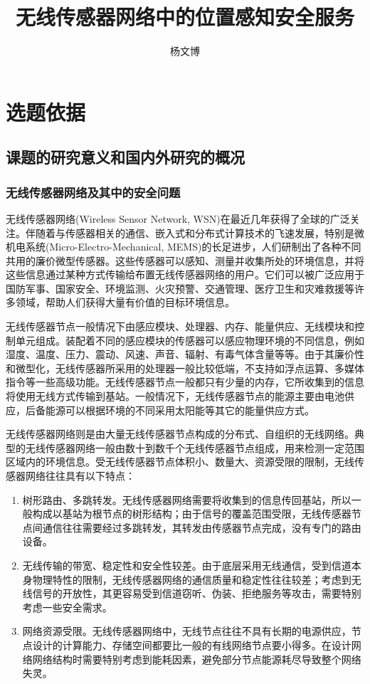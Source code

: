 \documentclass[a4paper,10pt]{article}
\title{无线传感器网络中的位置感知安全服务}
\author{杨文博}
\begin{document}
\maketitle

\section{ 选题依据 } 

\subsection{课题的研究意义和国内外研究的概况}

\subsubsection{无线传感器网络及其中的安全问题}  

无线传感器网络(Wireless Sensor Network, WSN)在最近几年获得了全球的广泛关注。伴随着与传感器相关的通信、嵌入式和分布式计算技术的飞速发展，特别是微机电系统(Micro-Electro-Mechanical, MEMS)的长足进步，人们研制出了各种不同共用的廉价微型传感器。这些传感器可以感知、测量并收集所处的环境信息，并将这些信息通过某种方式传输给布置无线传感器网络的用户。它们可以被广泛应用于国防军事、国家安全、环境监测、火灾预警、交通管理、医疗卫生和灾难救援等许多领域，帮助人们获得大量有价值的目标环境信息。

无线传感器节点一般情况下由感应模块、处理器、内存、能量供应、无线模块和控制单元组成。装配着不同的感应模块的传感器可以感应物理环境的不同信息，例如湿度、温度、压力、震动、风速、声音、辐射、有毒气体含量等等。由于其廉价性和微型化，无线传感器所采用的处理器一般比较低端，不支持如浮点运算、多媒体指令等一些高级功能。无线传感器节点一般都只有少量的内存，它所收集到的信息将使用无线方式传输到基站。一般情况下，无线传感器节点的能源主要由电池供应，后备能源可以根据环境的不同采用太阳能等其它的能量供应方式。

无线传感器网络则是由大量无线传感器节点构成的分布式、自组织的无线网络。典型的无线传感器网络一般由数十到数千个无线传感器节点组成，用来检测一定范围区域内的环境信息。受无线传感器节点体积小、数量大、资源受限的限制，无线传感器网络往往具有以下特点：

\begin{enumerate}

\item 树形路由、多跳转发。无线传感器网络需要将收集到的信息传回基站，所以一般构成以基站为根节点的树形结构；由于信号的覆盖范围受限，无线传感器节点间通信往往需要经过多跳转发，其转发由传感器节点完成，没有专门的路由设备。

\item 无线传输的带宽、稳定性和安全性较差。由于底层采用无线通信，受到信道本身物理特性的限制，无线传感器网络的通信质量和稳定性往往较差；考虑到无线信号的开放性，其更容易受到信道窃听、伪装、拒绝服务等攻击，需要特别考虑一些安全需求。

\item 网络资源受限。无线传感器网络中，无线节点往往不具有长期的电源供应，节点设计的计算能力、存储空间都要比一般的有线网络节点要小得多。在设计网络网络结构时需要特别考虑到能耗因素，避免部分节点能源耗尽导致整个网络失灵。

\end{enumerate}
\end{document}
